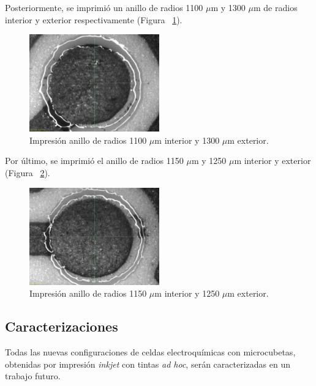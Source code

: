 Posteriormente, se imprimió un anillo de radios 1100 $\mu$m y 1300 $\mu$m de radios interior y exterior respectivamente (Figura ~\ref{fig:Figura_Anillo110a130_SU8}).

\begin{figure}[H]
  \centering
    \includegraphics[width=0.5\textwidth]{Figuras/Figura_Anillo110a130_SU8}
  \caption{Impresión anillo de radios 1100 $\mu$m interior y 1300 $\mu$m exterior.}
  \label{fig:Figura_Anillo110a130_SU8}
\end{figure}

Por último, se imprimió el anillo de radios 1150 $\mu$m y 1250 $\mu$m interior y exterior (Figura ~\ref{fig:Figura_Anillo115a125_SU8}).

\begin{figure}[H]
  \centering
    \includegraphics[width=0.5\textwidth]{Figuras/Figura_Anillo115a125_SU8}
  \caption{Impresión anillo de radios 1150 $\mu$m interior y 1250 $\mu$m exterior.}
  \label{fig:Figura_Anillo115a125_SU8}
\end{figure}

\subsection{Caracterizaciones}
Todas las nuevas configuraciones de celdas electroquímicas con microcubetas, obtenidas por impresión \textit{inkjet} con tintas \textit{ad hoc}, serán caracterizadas en un trabajo futuro.